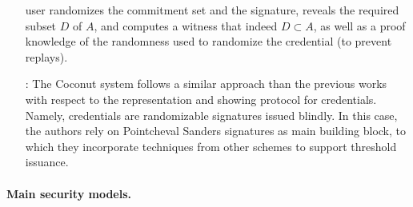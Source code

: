 \begin{enumerate}
  user randomizes the commitment set and the signature, reveals the required
  subset $D$ of $A$, and computes a witness that indeed $D \subset A$, as well
  as a proof knowledge of the randomness used to randomize the credential (to
  prevent replays). 
\item[\cite{sms+19}:] The Coconut system follows a similar approach than the previous
  works with respect to the representation and showing protocol for credentials.
  Namely, credentials are randomizable signatures issued blindly. In this case,
  the authors rely on Pointcheval Sanders signatures \cite{ps16} as main
  building block, to which they incorporate techniques from other schemes to
  support threshold issuance.
\end{enumerate}

\paragraph{Main security models.}

